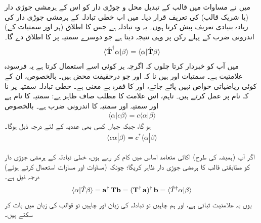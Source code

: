 میں نے مساوات  میں قالب کے تبدیل محل و جوڑی دار  کو اس کے   ہرمشی جوڑی دار  (یا شریک قالب) کی تعریف قرار دیا۔  میں اب  خطی تبادلہ کے ہرمشی جوڑی دار کی  زیادہ بنیادی تعریف پیش کرتا ہوں۔  یہ وہ تبادلہ  ہے جس کا اطلاق (ہر   اور  سمتیات کے)   اندرونی ضرب کے پہلے رکن پر وہی نتیجہ دیتا ہے جو دوسرے سمتیہ پر   کا اطلاق دے گا۔
\begin{align}
	\langle\hat{\operatorname{\mathbf{T}}}^{\dagger}\alpha|\beta\rangle = \langle\alpha|\hat{\operatorname{\mathbf{T}}}\beta\rangle
\end{align}
  میں آپ کو خبردار کرتا چلوں کہ اگرچہ ہر کوئی اسے استعمال کرتا ہے یہ فرسودہ علامتیت ہے۔ سمتیات   اور  ہیں نا کہ   اور  جو درحقیقت  محض  ہیں۔ بالخصوص،  ان کے کوئی ریاضیاتی خواص نہیں پائے جاتے،  اور   کا فقرہ بے معنی ہے۔ خطی تبادلہ  سمتیہ پر نا کہ نام پر عمل کرتے ہیں۔ تاہم،  اس علامت کا مطلب صاف ظاہر ہے: سمتیہ    کا نام     ہے اور سمتیہ  اور سمتیہ  کا اندرونی ضرب  ہے۔ بالخصوص
\begin{align}
	\langle\alpha| c\beta\rangle = c\langle\alpha|\beta\rangle
\end{align}
ہو گا، جبکہ  جہاں کسی بھی عددیہ  کے لئے درجہ ذیل ہوگا۔
\begin{align}
	\langle c\alpha|\beta\rangle = c^{*}\langle\alpha|\beta\rangle
\end{align}

اگر آپ (ہمیشہ کی طرح)  اکائی متعامد اساس میں کام کر رہے ہوں، خطی تبادلہ کے ہرمشی جوڑی دار کو مطابقتی قالب کا ہرمشی جوڑی دار ظاہر کریگا؛  چونکہ (مساوات  اور مساوات   استعمال کرتے ہوئے)  درجہ ذیل ہے۔
\begin{align}
	\langle\alpha|\hat{T}\beta\rangle = \operatorname{\mathbf{a}}^\dagger \operatorname{\mathbf{Tb}} = (\operatorname{\mathbf{T}}^\dagger \operatorname{\mathbf{a}})^\dagger \operatorname{\mathbf{b}} = \langle\hat{T}^\dagger\alpha|\beta\rangle
\end{align}
یوں یہ علامتیت ثباتی  ہے،  اور ہم چاہیں تو تبادلہ کی زبان اور چاہیں تو قوالب کی زبان میں بات کر سکتے ہیں۔

